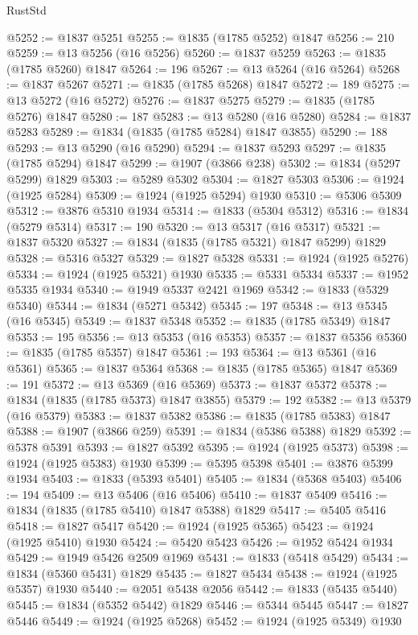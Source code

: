 \begin{lexlean}{RustStd}
\begin{coremodule}
{\begin{coremodule}
{{{{{@5252 := @1837 @5251
@5255 := @1835 (@1785 @5252) @1847
@5256 := 210
@5259 := @13 @5256 (@16 @5256)
@5260 := @1837 @5259
@5263 := @1835 (@1785 @5260) @1847
@5264 := 196
@5267 := @13 @5264 (@16 @5264)
@5268 := @1837 @5267
@5271 := @1835 (@1785 @5268) @1847
@5272 := 189
@5275 := @13 @5272 (@16 @5272)
@5276 := @1837 @5275
@5279 := @1835 (@1785 @5276) @1847
@5280 := 187
@5283 := @13 @5280 (@16 @5280)
@5284 := @1837 @5283
@5289 := @1834 (@1835 (@1785 @5284) @1847 @3855)
@5290 := 188
@5293 := @13 @5290 (@16 @5290)
@5294 := @1837 @5293
@5297 := @1835 (@1785 @5294) @1847
@5299 := @1907 (@3866 @238)
@5302 := @1834 (@5297 @5299) @1829
@5303 := @5289 @5302
@5304 := @1827 @5303
@5306 := @1924 (@1925 @5284)
@5309 := @1924 (@1925 @5294) @1930
@5310 := @5306 @5309
@5312 := @3876 @5310 @1934
@5314 := @1833 (@5304 @5312)
@5316 := @1834 (@5279 @5314)
@5317 := 190
@5320 := @13 @5317 (@16 @5317)
@5321 := @1837 @5320
@5327 := @1834 (@1835 (@1785 @5321) @1847 @5299) @1829
@5328 := @5316 @5327
@5329 := @1827 @5328
@5331 := @1924 (@1925 @5276)
@5334 := @1924 (@1925 @5321) @1930
@5335 := @5331 @5334
@5337 := @1952 @5335 @1934
@5340 := @1949 @5337 @2421 @1969
@5342 := @1833 (@5329 @5340)
@5344 := @1834 (@5271 @5342)
@5345 := 197
@5348 := @13 @5345 (@16 @5345)
@5349 := @1837 @5348
@5352 := @1835 (@1785 @5349) @1847
@5353 := 195
@5356 := @13 @5353 (@16 @5353)
@5357 := @1837 @5356
@5360 := @1835 (@1785 @5357) @1847
@5361 := 193
@5364 := @13 @5361 (@16 @5361)
@5365 := @1837 @5364
@5368 := @1835 (@1785 @5365) @1847
@5369 := 191
@5372 := @13 @5369 (@16 @5369)
@5373 := @1837 @5372
@5378 := @1834 (@1835 (@1785 @5373) @1847 @3855)
@5379 := 192
@5382 := @13 @5379 (@16 @5379)
@5383 := @1837 @5382
@5386 := @1835 (@1785 @5383) @1847
@5388 := @1907 (@3866 @259)
@5391 := @1834 (@5386 @5388) @1829
@5392 := @5378 @5391
@5393 := @1827 @5392
@5395 := @1924 (@1925 @5373)
@5398 := @1924 (@1925 @5383) @1930
@5399 := @5395 @5398
@5401 := @3876 @5399 @1934
@5403 := @1833 (@5393 @5401)
@5405 := @1834 (@5368 @5403)
@5406 := 194
@5409 := @13 @5406 (@16 @5406)
@5410 := @1837 @5409
@5416 := @1834 (@1835 (@1785 @5410) @1847 @5388) @1829
@5417 := @5405 @5416
@5418 := @1827 @5417
@5420 := @1924 (@1925 @5365)
@5423 := @1924 (@1925 @5410) @1930
@5424 := @5420 @5423
@5426 := @1952 @5424 @1934
@5429 := @1949 @5426 @2509 @1969
@5431 := @1833 (@5418 @5429)
@5434 := @1834 (@5360 @5431) @1829
@5435 := @1827 @5434
@5438 := @1924 (@1925 @5357) @1930
@5440 := @2051 @5438 @2056
@5442 := @1833 (@5435 @5440)
@5445 := @1834 (@5352 @5442) @1829
@5446 := @5344 @5445
@5447 := @1827 @5446
@5449 := @1924 (@1925 @5268)
@5452 := @1924 (@1925 @5349) @1930
}}}}}
\end{coremodule}}
\end{coremodule}
\end{lexlean}

